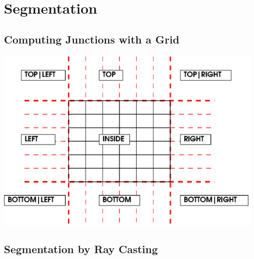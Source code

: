 \documentclass[aps]{revtex4}
\begin{document}
\section{Segmentation}
\subsection{Computing Junctions with a Grid}

\begin{center}
\includegraphics[scale=1]{grid.eps}
\end{center}

\subsection{Segmentation by Ray Casting}
\end{document}
